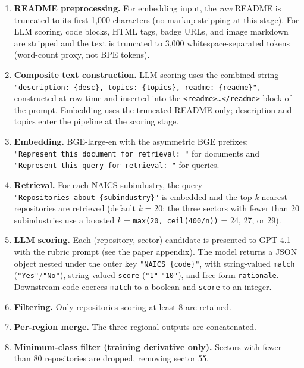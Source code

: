 \begin{enumerate}
\def\labelenumi{\arabic{enumi}.}
\tightlist
\item
  \textbf{README preprocessing.} For embedding input, the \emph{raw}
  README is truncated to its first 1,000 characters (no markup
  stripping at this stage). For LLM scoring, code blocks, HTML tags,
  badge URLs, and image markdown are stripped and the text is
  truncated to 3,000 whitespace-separated tokens (word-count proxy,
  not BPE tokens).
\item
  \textbf{Composite text construction.} LLM scoring uses the combined
  string \texttt{"description:\ \{desc\},\ topics:\ \{topics\},\ readme:\ \{readme\}"},
  constructed at row time and inserted into the
  \texttt{\textless{}readme\textgreater{}\dots\textless{}/readme\textgreater{}}
  block of the prompt. Embedding uses the truncated README only;
  description and topics enter the pipeline at the scoring stage.
\item
  \textbf{Embedding.} BGE-large-en with the asymmetric BGE prefixes:
  \texttt{"Represent\ this\ document\ for\ retrieval:\ "} for documents and
  \texttt{"Represent\ this\ query\ for\ retrieval:\ "} for queries.
\item
  \textbf{Retrieval.} For each NAICS subindustry, the query
  \texttt{"Repositories\ about\ \{subindustry\}"} is embedded and the top-\emph{k}
  nearest repositories are retrieved (default \emph{k} = 20; the three
  sectors with fewer than 20 subindustries use a boosted
  \emph{k} = \texttt{max(20,\ ceil(400/n))} = 24, 27, or 29).
\item
  \textbf{LLM scoring.} Each (repository, sector) candidate is presented
  to GPT-4.1 with the rubric prompt (see the paper appendix). The
  model returns a JSON object nested under the outer key
  \texttt{"NAICS\ \{code\}"}, with string-valued \texttt{match} (\texttt{"Yes"}/\texttt{"No"}),
  string-valued \texttt{score} (\texttt{"1"}-\texttt{"10"}), and free-form \texttt{rationale}.
  Downstream code coerces \texttt{match} to a boolean and \texttt{score} to an
  integer.
\item
  \textbf{Filtering.} Only repositories scoring at least 8 are retained.
\item
  \textbf{Per-region merge.} The three regional outputs are concatenated.
\item
  \textbf{Minimum-class filter (training derivative only).} Sectors with
  fewer than 80 repositories are dropped, removing sector 55.
\end{enumerate}

